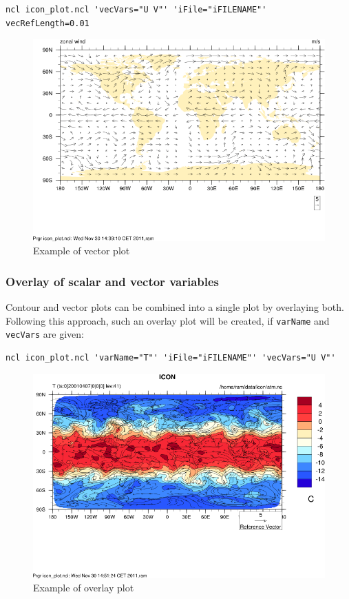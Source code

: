 \begin{small}
\begin{verbatim}
ncl icon_plot.ncl 'vecVars="U V"' 'iFile="iFILENAME"' vecRefLength=0.01
\end{verbatim}
\end{small}

\begin{figure}[h!]%
\centering
\includegraphics[width=0.95\linewidth]{pictures/vector_plot.png}
\caption{Example of vector plot}\label{fig:vector-plot}
\end{figure}

\subsubsection{Overlay of scalar and vector variables}
Contour and vector plots can be combined into a single plot by overlaying both. Following this approach, such an overlay plot will be created, if {\tt varName} and {\tt vecVars} are given: 

\begin{small}
\begin{verbatim}
ncl icon_plot.ncl 'varName="T"' 'iFile="iFILENAME"' 'vecVars="U V"'
\end{verbatim}
\end{small}

\begin{figure}[h!]%
\centering
\includegraphics[width=0.95\linewidth]{pictures/overlay_plot.png}
\caption{Example of overlay plot}\label{fig:overlay-plot}
\end{figure}

